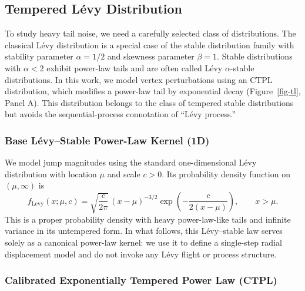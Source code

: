 \documentclass[
  11pt,
  letterpaper]{siamart251216}
\begin{document}
\subsection{Tempered Lévy Distribution}\label{sec-tl-distribution}

To study heavy tail noise, we need a carefully selected class of
distributions. The classical Lévy distribution is a special case of the
stable distribution family with stability parameter \(\alpha = 1/2\) and
skewness parameter \(\beta = 1\). Stable distributions with
\(\alpha < 2\) exhibit power-law tails and are often called Lévy
\(\alpha\)-stable distributions. In this work, we model vertex
perturbations using an \ac{CTPL} distribution, which modifies a
power-law tail by exponential decay (Figure~\ref{fig-tl}, Panel A). This
distribution belongs to the class of tempered stable
distributions\citep{Rosinski2007} but avoids the sequential-process
connotation of ``Lévy process.''

\subsubsection{Base Lévy--Stable Power-Law Kernel
(1D)}\label{sec-levy-base}

We model jump magnitudes using the standard one-dimensional Lévy
distribution with location \(\mu\) and scale \(c>0\). Its probability
density function on \((\mu,\infty)\) is \[
f_{\text{Levy}}(x; \mu, c)
= \sqrt{\frac{c}{2\pi}}\,(x-\mu)^{-3/2}
  \exp\!\left(-\frac{c}{2(x-\mu)}\right),
\qquad x>\mu.
\] This is a proper probability density with heavy power-law-like tails
and infinite variance in its untempered form. In what follows, this
Lévy--stable law serves solely as a canonical power-law kernel: we use
it to define a single-step radial displacement model and do not invoke
any Lévy flight or process structure.

\subsubsection{Calibrated Exponentially Tempered Power Law
(CTPL)}\label{sec-ctpl}
\end{document}

